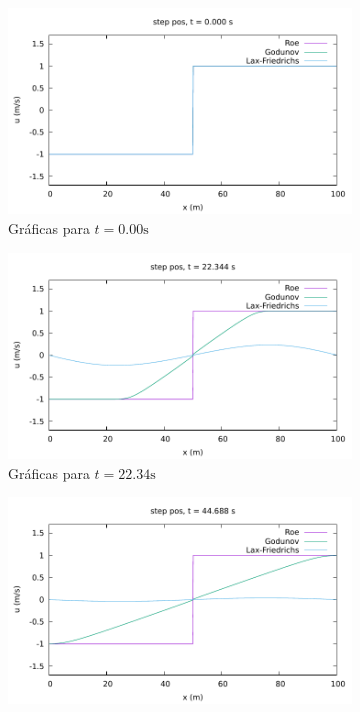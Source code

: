 \documentclass[12pt]{article}
\begin{document}
	\begin{figure}[h!]
		\centering
		\begin{subfigure}{0.49\textwidth}
			\centering
			\includegraphics[width=\textwidth]{../burgers1DVF/results/sol_periodicas/step_pos/000.pdf}
			\caption*{Gráficas para $t=0.00\unit{\second}$}
			\label{fig:step_pos-perio1}
		\end{subfigure}\hfill
		\begin{subfigure}{0.49\textwidth}
			\centering
			\includegraphics[width=\textwidth]{../burgers1DVF/results/sol_periodicas/step_pos/021.pdf}
			\caption*{Gráficas para $t=22.34\unit{\second}$}
			\label{fig:step_pos-perio2}
		\end{subfigure}\par
		\begin{subfigure}{0.49\textwidth}
			\centering
			\includegraphics[width=\textwidth]{../burgers1DVF/results/sol_periodicas/step_pos/042.pdf}

\end{subfigure}
\end{figure}
\end{document}

